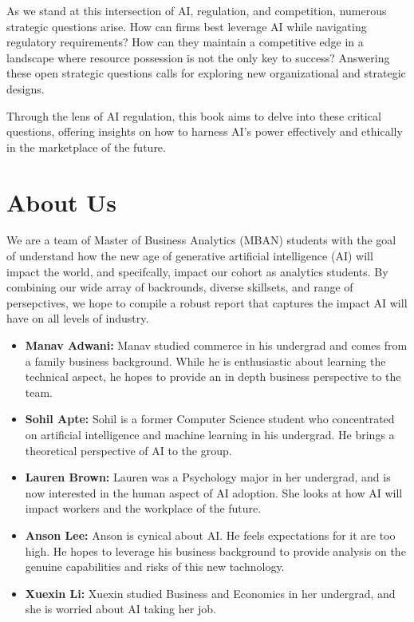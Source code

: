 \documentclass[
]{book}
\begin{document}
As we stand at this intersection of AI, regulation, and competition, numerous strategic questions arise. How can firms best leverage AI while navigating regulatory requirements? How can they maintain a competitive edge in a landscape where resource possession is not the only key to success? Answering these open strategic questions calls for exploring new organizational and strategic designs.

Through the lens of AI regulation, this book aims to delve into these critical questions, offering insights on how to harness AI's power effectively and ethically in the marketplace of the future.

\hypertarget{about-us}{%
\chapter{About Us}\label{about-us}}

We are a team of Master of Business Analytics (MBAN) students with the goal of understand how the new age of generative artificial intelligence (AI) will impact the world, and specifcally, impact our cohort as analytics students. By combining our wide array of backrounds, diverse skillsets, and range of persepctives, we hope to compile a robust report that captures the impact AI will have on all levels of industry.

\begin{itemize}
\item
  \textbf{Manav Adwani:} Manav studied commerce in his undergrad and comes from a family business background. While he is enthusiastic about learning the technical aspect, he hopes to provide an in depth business perspective to the team.
\item
  \textbf{Sohil Apte:} Sohil is a former Computer Science student who concentrated on artificial intelligence and machine learning in his undergrad. He brings a theoretical perspective of AI to the group.
\item
  \textbf{Lauren Brown:} Lauren was a Psychology major in her undergrad, and is now interested in the human aspect of AI adoption. She looks at how AI will impact workers and the workplace of the future.
\item
  \textbf{Anson Lee:} Anson is cynical about AI. He feels expectations for it are too high. He hopes to leverage his business background to provide analysis on the genuine capabilities and risks of this new tachnology.
\item
  \textbf{Xuexin Li:} Xuexin studied Business and Economics in her undergrad, and she is worried about AI taking her job.
\end{itemize}
\end{document}
